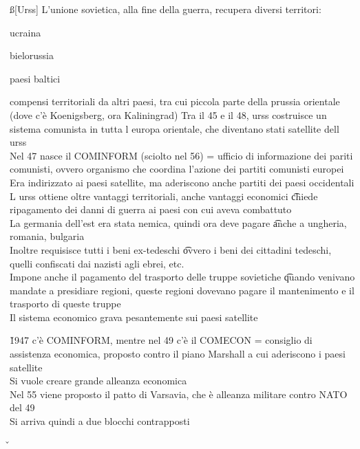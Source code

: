 \documentclass[12pt]{article}
\begin{document}
\ss[Urss]
L'unione sovietica, alla fine della guerra, recupera diversi territori:
\bi
  \item ucraina
  \item bielorussia
  \item paesi baltici
  \item compensi territoriali da altri paesi, tra cui piccola parte della prussia orientale (dove c'è Koenigsberg, ora Kaliningrad)
\ei
Tra il 45 e il 48, urss costruisce un sistema comunista in tutta l europa orientale, che diventano stati satellite dell urss \\
Nel 47 nasce il COMINFORM (sciolto nel 56) = ufficio di informazione dei pariti comunisti, ovvero organismo che coordina l'azione dei partiti comunisti europei \\
Era indirizzato ai paesi satellite, ma aderiscono anche partiti dei paesi occidentali \\
L urss ottiene oltre vantaggi territoriali, anche vantaggi economici \t chiede ripagamento dei danni di guerra ai paesi con cui aveva combattuto \\
La germania dell'est era stata nemica, quindi ora deve pagare \t anche a ungheria, romania, bulgaria \\
Inoltre requisisce tutti i beni ex-tedeschi \t ovvero i beni dei cittadini tedeschi, quelli confiscati dai nazisti agli ebrei, etc. \\
Impone anche il pagamento del trasporto delle truppe sovietiche \t quando venivano mandate a presidiare regioni, queste regioni dovevano pagare il mantenimento e il trasporto di queste truppe \\
Il sistema economico grava pesantemente sui paesi satellite

\v

1947 c'è COMINFORM, mentre nel 49 c'è il COMECON = consiglio di assistenza economica, proposto contro il piano Marshall a cui aderiscono i paesi satellite \\
Si vuole creare grande alleanza economica \\
Nel 55 viene proposto il patto di Varsavia, che è alleanza militare contro NATO del 49 \\
Si arriva quindi a due blocchi contrapposti

\v
\end{document}
